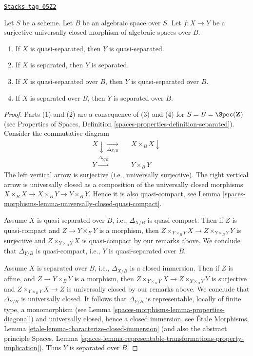 \begin{lemma}
\label{spaces-morphisms-lemma-image-universally-closed-separated}
\href{https://stacks.math.columbia.edu/tag/05Z2}{\texttt{Stacks tag 05Z2}}

Let $S$ be a scheme. Let $B$ be an algebraic space over $S$.
Let $f : X \to Y$ be a surjective universally closed
morphism of algebraic spaces over $B$.
\begin{enumerate}
\item If $X$ is quasi-separated, then $Y$ is quasi-separated.
\item If $X$ is separated, then $Y$ is separated.
\item If $X$ is quasi-separated over $B$, then $Y$ is quasi-separated over $B$.
\item If $X$ is separated over $B$, then $Y$ is separated over $B$.
\end{enumerate}
\end{lemma}

\begin{proof}
Parts (1) and (2) are a consequence of (3) and (4) for
$S = B = \Spec(\mathbf{Z})$ (see
Properties of Spaces,
Definition \ref{spaces-properties-definition-separated}).
Consider the commutative diagram
$$
\begin{array}{ccc}X \downarrow\underset{\Delta_{X/B}}{\longrightarrow} &  & X \times_B X \downarrow \\ Y \overset{\Delta_{Y/B}}{\longrightarrow} &  & Y \times_B Y\end{array}
$$
The left vertical arrow is surjective (i.e., universally surjective).
The right vertical arrow is universally closed as a composition
of the universally closed morphisms
$X \times_B X \to X \times_B Y \to Y \times_B Y$. Hence it is also
quasi-compact, see
Lemma \ref{spaces-morphisms-lemma-universally-closed-quasi-compact}.

\medskip\noindent
Assume $X$ is quasi-separated over $B$, i.e.,  $\Delta_{X/B}$ is
quasi-compact. Then if $Z$ is quasi-compact and $Z \to Y \times_B Y$ is
a morphism, then $Z \times_{Y \times_B Y} X \to Z \times_{Y \times_B Y} Y$
is surjective and $Z \times_{Y \times_B Y} X$ is quasi-compact by our remarks
above. We conclude that $\Delta_{Y/B}$ is quasi-compact, i.e., $Y$
is quasi-separated over $B$.

\medskip\noindent
Assume $X$ is separated over $B$, i.e., $\Delta_{X/B}$ is a closed
immersion. Then if $Z$ is affine, and $Z \to Y \times_B Y$ is
a morphism, then $Z \times_{Y \times_B Y} X \to Z \times_{Y \times_B Y} Y$
is surjective and $Z \times_{Y \times_B Y} X \to Z$ is universally closed
by our remarks above. We conclude that $\Delta_{Y/B}$ is universally closed.
It follows that $\Delta_{Y/B}$ is representable, locally of finite type, a
monomorphism (see
Lemma \ref{spaces-morphisms-lemma-properties-diagonal})
and universally closed, hence a closed immersion, see
\'Etale Morphisms,
Lemma \ref{etale-lemma-characterize-closed-immersion}
(and also the abstract principle
Spaces, Lemma
\ref{spaces-lemma-representable-transformations-property-implication}).
Thus $Y$ is separated over $B$.
\end{proof}

